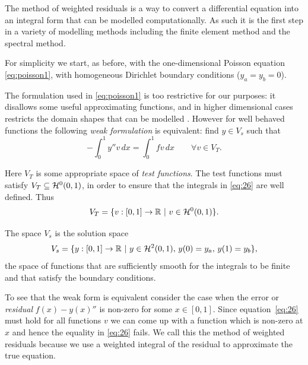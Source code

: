 The method of weighted residuals is a way to convert a differential equation
into an integral form that can be modelled computationally. As such it is the
first step in a variety of modelling methods including the finite element method
and the spectral method.

For simplicity we start, as before, with the one-dimensional Poisson equation
\eqref{eq:poisson1}, with homogeneous Dirichlet boundary conditions
(\ie $y_{a}=y_{b}=0$).


The formulation used in \eqref{eq:poisson1} is too restrictive for our purposes:
it disallows some useful approximating functions, and in higher dimensional
cases restricts the domain shapes that can be modelled
\cite{HowardElmanDavidSilvester2006}. However for well behaved functions the
following \emph{weak formulation} is equivalent: find $y\in V_{s}$ such that
\begin{equation}
  -\int_{0}^{1}y''v\, dx=\int_{0}^{1}fv\, dx \qquad \forall v\in V_{T}.
  \label{eq:26}
\end{equation}

Here $V_{T}$ is some appropriate space of \emph{test functions}. The test
functions must satisfy $V_{T}\subseteq \mathcal{H}^0(0,1)$, in order to ensure that the integrals in \eqref{eq:26} are well defined. Thus
\begin{equation}
  \label{eq:28}
  V_{T}=\{v:[0,1]\rightarrow\mathbb{R}\, \,|\, \, v \in \mathcal{H}^0(0,1)\}.
\end{equation}

The space $V_{s}$ is the solution space
\begin{equation*}
  V_{s}=\{y:[0,1]\rightarrow\mathbb{R}\, \,|\, \, y \in \mathcal{H}^2(0,1),\,
  y(0) = y_{a},\, y(1) = y_{b}\},
\end{equation*}
 \ie the space of functions that are sufficiently smooth for the integrals to be finite and that satisfy the boundary conditions.

To see that the weak form is equivalent consider the case when the error or \emph{residual} $f(x) -y(x)''$ is non-zero for some $x \in [0,1]$. Since equation~\eqref{eq:26} must hold for all functions $v$ we can come up with a function which is non-zero at $x$ and hence the equality in \eqref{eq:26} fails. We call this the method of weighted residuals because we use a weighted integral of the residual to approximate the true equation.\cite[pg. 210, 214]{Zeinkiewicz1967}

